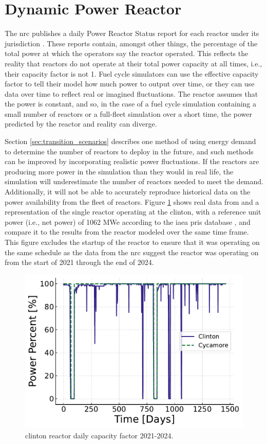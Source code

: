 \section{Dynamic Power Reactor}
\label{sec:dpr_method}

The \gls{nrc} publishes a daily Power Reactor Status report for each reactor
under its jurisdiction \cite{nrc_power_2025}. These reports contain, amongst
other things, the percentage of the total power at which the operators
say the reactor operated. This reflects the reality that reactors do not operate at their total power capacity at all times, i.e., their capacity factor is not 1. Fuel cycle simulators can use the effective capacity factor to tell their model how much power to output over time, or they can use data over time to reflect real or imagined fluctuations. The \cycamore reactor assumes that the power is constant, and so, in the case of a fuel cycle simulation containing a small number of reactors or a full-fleet simulation over a short time, the power predicted by the \cycamore reactor and reality can diverge.

Section \ref{sec:transition_scenarios} describes one method of using energy demand to determine the number of reactors to deploy in the future, and such methods can be improved by incorporating realistic power fluctuations. If the reactors are producing more power in the simulation than they would in real life, the simulation will underestimate the number of reactors needed to meet the demand. Additionally, it will not be able to accurately reproduce historical data on the power availability from the fleet of reactors. Figure \ref{fig:pp_full} shows real data from and a \cycamore representation of the single reactor operating at the \gls{clinton}, with a reference unit power (i.e., net power) of 1062 MWe according to the \gls{iaea} \gls{pris} database \cite{IAEA_PRIS}, and compare it to the results from the \cycamore reactor modeled over the same time frame. This figure excludes the startup of the \cycamore reactor to ensure that it was operating on the same schedule as the data from the \gls{nrc} suggest the reactor was operating on from the start of 2021 through the end of 2024.

\begin{figure}[H]
  \centering
  \includegraphics[width=0.7\linewidth]{images/power_reactor/power_percent_clinton_fake.pdf}
  \caption{\gls{clinton} reactor daily capacity factor 2021-2024.}
  \label{fig:pp_full}
\end{figure}

